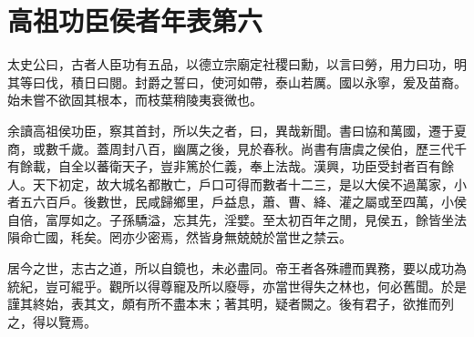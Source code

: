\chapter{高祖功臣侯者年表第六}

太史公曰，古者人臣功有五品，以德立宗廟定社稷曰勳，以言曰勞，用力曰功，明其等曰伐，積日曰閱。封爵之誓曰，使河如帶，泰山若厲。國以永寧，爰及苗裔。始未嘗不欲固其根本，而枝葉稍陵夷衰微也。

余讀高祖侯功臣，察其首封，所以失之者，曰，異哉新聞。書曰協和萬國，遷于夏商，或數千歲。蓋周封八百，幽厲之後，見於春秋。尚書有唐虞之侯伯，歷三代千有餘載，自全以蕃衛天子，豈非篤於仁義，奉上法哉。漢興，功臣受封者百有餘人。天下初定，故大城名都散亡，戶口可得而數者十二三，是以大侯不過萬家，小者五六百戶。後數世，民咸歸鄉里，戶益息，蕭、曹、絳、灌之屬或至四萬，小侯自倍，富厚如之。子孫驕溢，忘其先，淫嬖。至太初百年之閒，見侯五，餘皆坐法隕命亡國，秏矣。罔亦少密焉，然皆身無兢兢於當世之禁云。

居今之世，志古之道，所以自鏡也，未必盡同。帝王者各殊禮而異務，要以成功為統紀，豈可緄乎。觀所以得尊寵及所以廢辱，亦當世得失之林也，何必舊聞。於是謹其終始，表其文，頗有所不盡本末；著其明，疑者闕之。後有君子，欲推而列之，得以覽焉。


